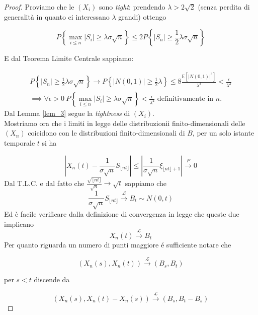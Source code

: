 \documentclass[11pt, twoside]{report}
\theoremstyle{definition}
\theoremstyle{plain}
\theoremstyle{remark}
\numberwithin{equation}{chapter}
\begin{document}
\begin{proof} Proviamo che le $(X_i)$ sono \textit{tight}: prendendo $\lambda > 2\sqrt 2$ (senza perdita di generalità in quanto ci interessano $\lambda$ grandi) ottengo

$$P\left\{\max\limits_{i\leq n}|S_i| \geq \lambda \sigma \sqrt n\right\} \leq 2 P\left\{ |S_n| \geq \frac{1}{2}\lambda \sigma \sqrt n \right\}$$

E dal Teorema Limite Centrale sappiamo:

\begin{gather}
P\left\{ |S_n| \geq \frac{1}{2}\lambda \sigma \sqrt n \right\} \longrightarrow P\left\{|N(0,1)| \geq \frac{1}{2}\lambda \right\} \leq 8\frac{ \mathbb E \left[ \left| N(0,1) \right|^3\right]}{\lambda^3}<\frac{\epsilon}{\lambda^2} \nonumber \\
\implies \forall \epsilon>0 \  P\left\{\max\limits_{i\leq n}|S_i| \geq \lambda \sigma \sqrt n\right\}<\frac{\epsilon}{\lambda^2} \text{ definitivamente in } n.
\end{gather}
Dal Lemma \ref{lem_3} segue la \textit{tightness} di $(X_i)$. \\

Mostriamo ora che i limiti in legge delle distribuzionii finito-dimensionali delle $(X_n)$ coicidono con le distribuzioni finito-dimensionali di $B$, per un solo istante temporale $t$ si ha

$$\left|{ X_n(t) - \frac{1}{\sigma \sqrt n} S_{\lfloor nt \rfloor} }\right| \leq \left| \frac{1}{\sigma \sqrt n} \xi_{\lfloor nt \rfloor +1} \right| \xrightarrow{P}0$$
Dal T.L.C. e dal fatto che $\frac{\sqrt{\lfloor nt \rfloor}}{\sqrt{n}} \longrightarrow \sqrt{t}$ sappiamo che 
$$\frac{1}{\sigma \sqrt n}S_{\lfloor nt \rfloor}\xrightarrow{\mathscr L}B_t\sim N(0,t)$$
Ed è facile verificare dalla definizione di convergenza in legge che queste due implicano
$$X_n(t)\xrightarrow{\mathscr L}B_t $$
Per quanto riguarda un numero di punti maggiore \'e sufficiente notare che 

$$(X_n(s),X_n(t))\xrightarrow{\mathscr L}(B_s,B_t) $$

per $s<t$ discende da

$$(X_n(s),X_n(t)-X_n(s))\xrightarrow{\mathscr L}(B_s,B_t-B_s) $$


\end{proof}
\end{document}
